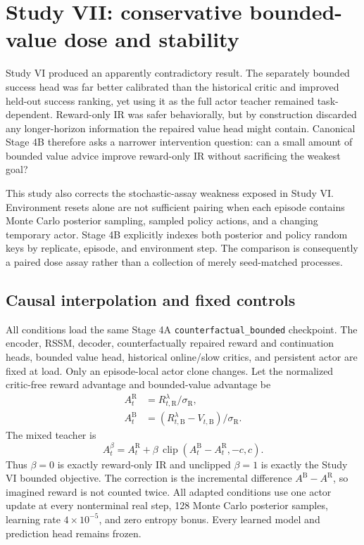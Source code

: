 \documentclass[10pt]{article}
\begin{document}
\section{Study VII: conservative bounded-value dose and stability}

Study VI produced an apparently contradictory result. The separately bounded
success head was far better calibrated than the historical critic and improved
held-out success ranking, yet using it as the full actor teacher remained
task-dependent. Reward-only IR was safer behaviorally, but by construction
discarded any longer-horizon information the repaired value head might contain.
Canonical Stage 4B therefore asks a narrower intervention question: can a
small amount of bounded value advice improve reward-only IR without sacrificing
the weakest goal?

This study also corrects the stochastic-assay weakness exposed in Study VI.
Environment resets alone are not sufficient pairing when each episode contains
Monte Carlo posterior sampling, sampled policy actions, and a changing temporary
actor. Stage 4B explicitly indexes both posterior and policy random keys by
replicate, episode, and environment step. The comparison is consequently a
paired dose assay rather than a collection of merely seed-matched processes.

\subsection{Causal interpolation and fixed controls}

All conditions load the same Stage 4A
\texttt{counterfactual\_bounded} checkpoint. The encoder, RSSM, decoder,
counterfactually repaired reward and continuation heads, bounded value head,
historical online/slow critics, and persistent actor are fixed at load. Only an
episode-local actor clone changes. Let the normalized critic-free reward
advantage and bounded-value advantage be
\begin{align}
 A_t^{\mathrm R} &= R_{t,\mathrm R}^{\lambda}/\sigma_{\mathrm R},\\
 A_t^{\mathrm B} &= (R_{t,\mathrm B}^{\lambda}-V_{t,\mathrm B})/
                    \sigma_{\mathrm R}.
\end{align}
The mixed teacher is
\begin{equation}
 A_t^{\beta}=A_t^{\mathrm R}+
 \beta\,\operatorname{clip}(A_t^{\mathrm B}-A_t^{\mathrm R},-c,c).
 \label{eq:stage4bmix}
\end{equation}
Thus $\beta=0$ is exactly reward-only IR and unclipped $\beta=1$ is exactly the
Study VI bounded objective. The correction is the incremental difference
$A^{\mathrm B}-A^{\mathrm R}$, so imagined reward is not counted twice. All
adapted conditions use one actor update at every nonterminal real step, 128
Monte Carlo posterior samples, learning rate $4\times10^{-5}$, and zero entropy
bonus. Every learned model and prediction head remains frozen.
\end{document}
